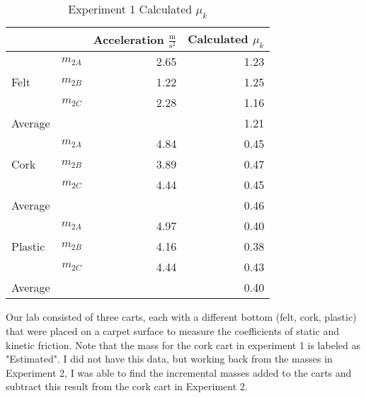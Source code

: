 \documentclass [12pt, letterpaper, twoside] {article}
\begin{document}
  \begin {table}[h]
    \centering
    \begin {tabular} {| l | r | r | r |}
      \hline\hline
      & & Acceleration \(\tfrac{\text{m}}{\text{s}^2}\) & Calculated \(\mu_{k}\) \\
      \hline
      \multirow {3}{*}{Felt} & \(m_{2A}\) & 2.65 & 1.23 \\ %
      & \(m_{2B}\) & 1.22 & 1.25 \\ %
      & \(m_{2C}\) & 2.28 & 1.16 \\ %
      \hline
      Average & & & 1.21 \\ %
      \hline
      \multirow {3}{*}{Cork} & \(m_{2A}\) & 4.84 & 0.45 \\ %
      & \(m_{2B}\) & 3.89 & 0.47 \\ %
      & \(m_{2C}\) & 4.44 & 0.45 \\ %
      \hline
      Average & & & 0.46 \\ %
      \hline
      \multirow {3}{*}{Plastic} & \(m_{2A}\) & 4.97 & 0.40 \\ %
      & \(m_{2B}\) & 4.16 & 0.38 \\ %
      & \(m_{2C}\) & 4.44 & 0.43 \\ %
      \hline
      Average & & & 0.40 \\ %
      \hline\hline
    \end {tabular}
    \caption {Experiment 1 Calculated \(\mu_{k}\)}
  \end {table}

\noindent
Our lab consisted of three carts, each with a different bottom (felt, cork, plastic) that were placed on a carpet surface to measure the coefficients of static and kinetic friction. Note that the mass for the cork cart in experiment 1 is labeled as "Estimated". I did not have this data, but working back from the masses in Experiment 2, I was able to find the incremental masses added to the carts and subtract this result from the cork cart in Experiment 2.
\end{document}
